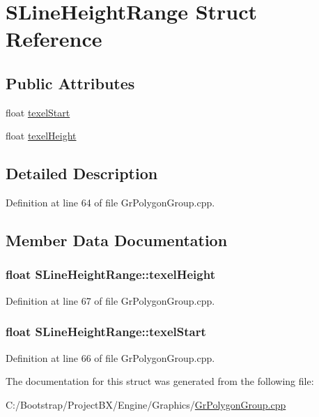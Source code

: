 \hypertarget{struct_s_line_height_range}{
\section{SLineHeightRange Struct Reference}
\label{struct_s_line_height_range}
}
\subsection*{Public Attributes}
\begin{CompactItemize}
\item 
float \hyperlink{struct_s_line_height_range_eb8741756e818510265720b20f87b084}{texelStart}
\item 
float \hyperlink{struct_s_line_height_range_893a7454b4fd6b3a9b24383ea84e4f8a}{texelHeight}
\end{CompactItemize}


\subsection{Detailed Description}


Definition at line 64 of file GrPolygonGroup.cpp.

\subsection{Member Data Documentation}
\hypertarget{struct_s_line_height_range_893a7454b4fd6b3a9b24383ea84e4f8a}{
\subsubsection[{texelHeight}]{\setlength{\rightskip}{0pt plus 5cm}float {\bf SLineHeightRange::texelHeight}}}
\label{struct_s_line_height_range_893a7454b4fd6b3a9b24383ea84e4f8a}




Definition at line 67 of file GrPolygonGroup.cpp.\hypertarget{struct_s_line_height_range_eb8741756e818510265720b20f87b084}{
\subsubsection[{texelStart}]{\setlength{\rightskip}{0pt plus 5cm}float {\bf SLineHeightRange::texelStart}}}
\label{struct_s_line_height_range_eb8741756e818510265720b20f87b084}




Definition at line 66 of file GrPolygonGroup.cpp.

The documentation for this struct was generated from the following file:\begin{CompactItemize}
\item 
C:/Bootstrap/ProjectBX/Engine/Graphics/\hyperlink{_gr_polygon_group_8cpp}{GrPolygonGroup.cpp}\end{CompactItemize}
